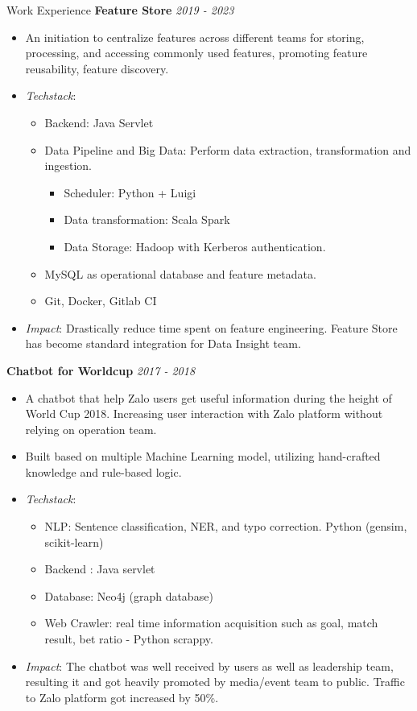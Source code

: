 \documentclass{resume} %
\begin{document}
\begin{rSection}{Work Experience}
\textbf{Feature Store} \hfill {\em \textit{2019 - 2023}}
\begin{itemize}
    \item An initiation to centralize features across different teams for storing, processing, and accessing commonly used features, promoting feature reusability, feature discovery.
    \item \textit{Techstack}:
    \begin{itemize}
        \item Backend: Java Servlet
        \item Data Pipeline and Big Data: Perform data extraction, transformation and ingestion.
        \begin{itemize}
            \item Scheduler: Python + Luigi 
            \item Data transformation: Scala Spark 
            \item Data Storage: Hadoop with Kerberos authentication.
        \end{itemize}
        \item MySQL as operational database and feature metadata.
        \item Git, Docker, Gitlab CI
    \end{itemize} 
    \item \textit{Impact}: Drastically reduce time spent on feature engineering. Feature Store has become standard integration for Data Insight team. 
\end{itemize}


\textbf{Chatbot for Worldcup} \hfill {\em \textit{2017 - 2018}}

\begin{itemize}
    \item A chatbot that help Zalo users get useful information during the height of World Cup 2018. Increasing user interaction with Zalo platform without relying on operation team.
    \item Built based on multiple Machine Learning model, utilizing hand-crafted knowledge and rule-based logic.
    \item \textit{Techstack}: 
    \begin{itemize}
            \item NLP: Sentence classification, NER, and typo correction. Python (gensim, scikit-learn)
            \item Backend : Java servlet
            \item Database: Neo4j (graph database)
            \item Web Crawler: real time information acquisition such as goal, match result, bet ratio - Python scrappy.
    \end{itemize}
    \item \textit{Impact}: The chatbot was well received by users as well as leadership team, resulting it and got heavily promoted by media/event team to public. Traffic to Zalo platform got increased by 50\%.
\end{itemize}


\end{rSection}
\end{document}
